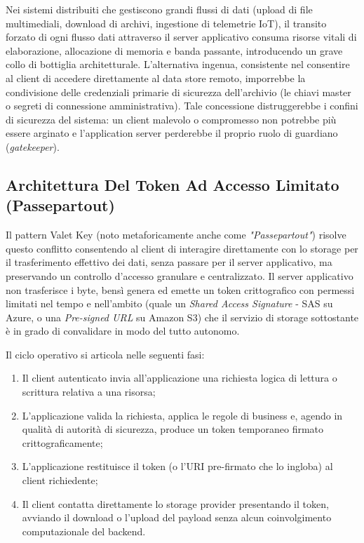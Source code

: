 \documentclass[11pt, a4paper]{article}
\begin{document}
Nei sistemi distribuiti che gestiscono grandi flussi di dati (upload di file multimediali, download di archivi, ingestione di telemetrie IoT), il transito forzato di ogni flusso dati attraverso il server applicativo consuma risorse vitali di elaborazione, allocazione di memoria e banda passante, introducendo un grave collo di bottiglia architetturale. L'alternativa ingenua, consistente nel consentire al client di accedere direttamente al data store remoto, imporrebbe la condivisione delle credenziali primarie di sicurezza dell'archivio (le chiavi master o segreti di connessione amministrativa). Tale concessione distruggerebbe i confini di sicurezza del sistema: un client malevolo o compromesso non potrebbe più essere arginato e l'application server perderebbe il proprio ruolo di guardiano (\emph{gatekeeper}).

\subsection{Architettura Del Token Ad Accesso Limitato (Passepartout)}

Il pattern Valet Key (noto metaforicamente anche come \emph{"Passepartout"}) risolve questo conflitto consentendo al client di interagire direttamente con lo storage per il trasferimento effettivo dei dati, senza passare per il server applicativo, ma preservando un controllo d'accesso granulare e centralizzato. Il server applicativo non trasferisce i byte, bensì genera ed emette un token crittografico con permessi limitati nel tempo e nell'ambito (quale un \emph{Shared Access Signature} - SAS su Azure, o una \emph{Pre-signed URL} su Amazon S3) che il servizio di storage sottostante è in grado di convalidare in modo del tutto autonomo.


Il ciclo operativo si articola nelle seguenti fasi:
\begin{enumerate}[noitemsep]
    \item Il client autenticato invia all'applicazione una richiesta logica di lettura o scrittura relativa a una risorsa;
    \item L'applicazione valida la richiesta, applica le regole di business e, agendo in qualità di autorità di sicurezza, produce un token temporaneo firmato crittograficamente;
    \item L'applicazione restituisce il token (o l'URI pre-firmato che lo ingloba) al client richiedente;
    \item Il client contatta direttamente lo storage provider presentando il token, avviando il download o l'upload del payload senza alcun coinvolgimento computazionale del backend.
\end{enumerate}
\end{document}
